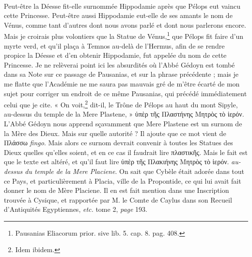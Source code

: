 \documentclass[a4paper, 18pt, oneside]{article}
\begin{document}
\paragraph{}
Peut-être la Déesse fit-elle surnommée Hippodamie après que Pélops eut vaincu cette Princesse. Peut-être aussi Hippodamie eut-elle de ses amants le nom de Vénus, comme tant d'autres dont nous avons parlé et dont nous parlerons encore. Mais je croirais plus volontiers que la Statue de Vénus,\footnote{Pausanias Eliacorum prior. sive lib. 5. cap. 8. pag. 408.} que Pélops fit faire d'un myrte verd, et qu'il plaça à Temnos au-delà de l'Hermus, afin de se rendre propice la Déesse et d'en obtenir Hippodamie, fut appelée du nom de cette Princesse. Je ne relèverai point ici les absurdités où l'Abbé Gédoyn est tombé dans sa Note sur ce passage de Pausanias, et sur la phrase précédente ; mais je me flatte que l'Académie ne me saura pas mauvais gré de m'être écarté de mon sujet pour corriger un endroit de ce même Pausanias, qui précédé immédiatement celui que je cite. « On voit,\footnote{Idem ibidem.} dit-il, le Trône de Pélops au haut du mont Sipyle, au-dessus du temple de la Mere Plastene, » ὑπὲρ τῆς Πλαστήνης Μητρὸς τὸ ἱερόν. L'Abbé Gédoyn nous apprend sçavamment que Mere Plastene est un surnom de la Mère des Dieux. Mais sur quelle autorité ? Il ajoute que ce mot vient de Πλάσσω \emph{fingo}. Mais alors ce surnom devrait convenir à toutes les Statues des Dieux quelles qu'elles soient, et en ce cas il faudrait lire πλαστικῆς. Mais le fait est que le texte est altéré, et qu'il faut lire ὑπὲρ τῆς Πλακιήνης Μητρὸς τὸ ἱερόν. \emph{au-dessus du temple de la Mere Placiene}. On sait que Cybèle était adorée dans tout ce Pays, et particulièrement à Placia, ville de la Propontide, ce qui lui avait fait donner le nom de Mère Placiene. Il en est fait mention dans une Inscription trouvée à Cysique, et rapportée par M. le Comte de Caylus dans son Recueil d'Antiquités Egyptiennes, \emph{etc.} tome 2, \emph{page} 193.
\end{document}

